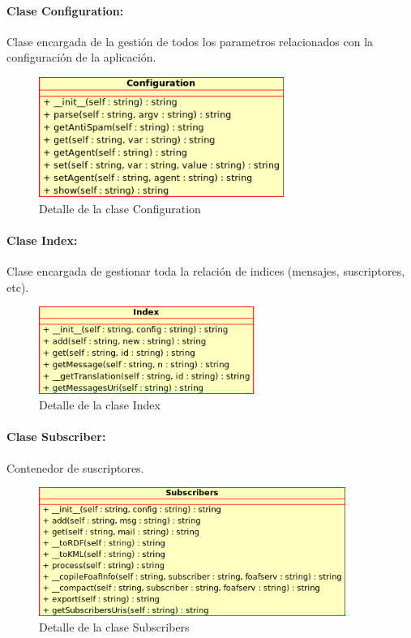 \paragraph{Clase Configuration:}

Clase encargada de la gestión de todos los parametros relacionados con la
configuración de la aplicación.

\begin{figure}[H]
	\centering
 	\includegraphics[width=8cm]{images/uml/clases/configuration-class.png}
	\caption{Detalle de la clase Configuration}
	\label{fig:uml:configuration-class}
\end{figure}

\paragraph{Clase Index:}

Clase encargada de gestionar toda la relación de indices (mensajes, suscriptores,
etc).

\begin{figure}[H]
	\centering
 	\includegraphics[width=7cm]{images/uml/clases/index-class.png}
	\caption{Detalle de la clase Index}
	\label{fig:uml:index-class}
\end{figure}

\paragraph{Clase Subscriber:}

Contenedor de suscriptores.

\begin{figure}[H]
	\centering
 	\includegraphics[width=10cm]{images/uml/clases/subscribers-class.png}
	\caption{Detalle de la clase Subscribers}
	\label{fig:uml:subscribers-class}
\end{figure}

